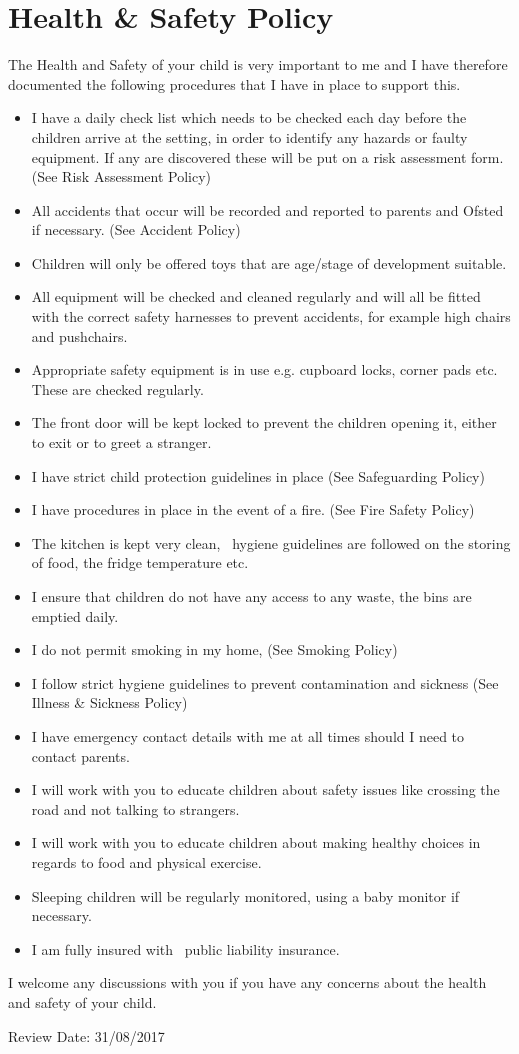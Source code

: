 
\section{Health \& Safety Policy}

The Health and Safety of your child is very important to me and I have
therefore documented the following procedures that I have in place to
support this.

\begin{itemize}
\item
  I have a daily check list which needs to be checked each day before
  the children arrive at the setting, in order to identify any hazards
  or faulty equipment. If any are discovered these will be put on a risk
  assessment form. (See Risk Assessment Policy)
\item
  All accidents that occur will be recorded and reported to parents and
  Ofsted if necessary. (See Accident Policy)
\item
  Children will only be offered toys that are age/stage of development
  suitable.
\item
  All equipment will be checked and cleaned regularly and will all be
  fitted with the correct safety harnesses to prevent accidents, for
  example high chairs and pushchairs.
\item
  Appropriate safety equipment is in use e.g. cupboard locks, corner
  pads etc. These are checked regularly.
\item
  The front door will be kept locked to prevent the children opening
  it, either to exit or to greet a stranger.
\item
  I have strict child protection guidelines in place (See Safeguarding
  Policy)
\item
  I have procedures in place in the event of a fire. (See Fire Safety
  Policy)
\item
  The kitchen is kept very clean, ~hygiene guidelines are followed on
  the storing of food, the fridge temperature etc.
\item
  I ensure that children do not have any access to any waste, the bins
  are emptied daily.
\item
  I do not permit smoking in my home, (See Smoking Policy)
\item
  I follow strict hygiene guidelines to prevent contamination and
  sickness (See Illness \& Sickness Policy)
\item
  I have emergency contact details with me at all times should I need
  to contact parents.
\item
  I will work with you to educate children about safety issues like
  crossing the road and not talking to strangers.
\item
  I will work with you to educate children about making healthy choices
  in regards to food and physical exercise.
\item
  Sleeping children will be regularly monitored, using a baby monitor
  if necessary.
\item
  I am fully insured with ~public liability insurance.
\end{itemize}

I welcome any discussions with you if you have any concerns about the
health and safety of your child.

Review Date: 31/08/2017


